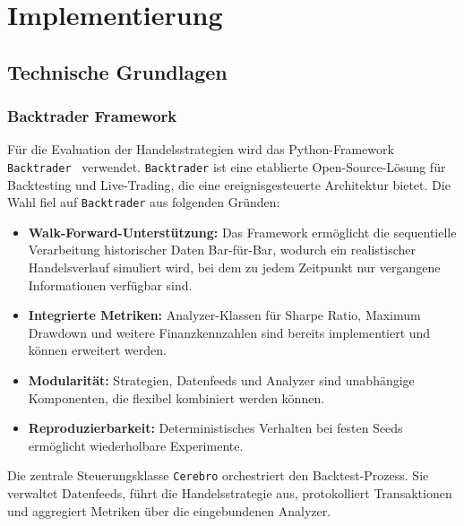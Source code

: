 \chapter{Implementierung}\label{chap:implementierung}

\section{Technische Grundlagen}\label{sec:tech_grundlagen}

\subsection{Backtrader Framework}\label{subsec:backtrader}
Für die Evaluation der Handelsstrategien wird das Python-Framework \texttt{Back\-trader}~\cite{backtrader} verwendet. \texttt{Backtrader} ist eine etablierte Open-Source-Lösung für Backtesting und Live-Trading, die eine ereignisgesteuerte Architektur bietet. Die Wahl fiel auf \texttt{Backtrader} aus folgenden Gründen:

\begin{itemize}
    \item \textbf{Walk-Forward-Unterstützung:} Das Framework ermöglicht die sequentielle Verarbeitung historischer Daten Bar-für-Bar, wodurch ein realistischer Handelsverlauf simuliert wird, bei dem zu jedem Zeitpunkt nur vergangene Informationen verfügbar sind.
    \item \textbf{Integrierte Metriken:} Analyzer-Klassen für Sharpe Ratio, Maximum Drawdown und weitere Finanzkennzahlen sind bereits implementiert und können erweitert werden.
    \item \textbf{Modularität:} Strategien, Datenfeeds und Analyzer sind unabhängige Komponenten, die flexibel kombiniert werden können.
    \item \textbf{Reproduzierbarkeit:} Deterministisches Verhalten bei festen Seeds ermöglicht wiederholbare Experimente.
\end{itemize}

Die zentrale Steuerungsklasse \texttt{Cerebro} orchestriert den Backtest-Prozess. Sie verwaltet Datenfeeds, führt die Handelsstrategie aus, protokolliert Transaktionen und aggregiert Metriken über die eingebundenen Analyzer.

